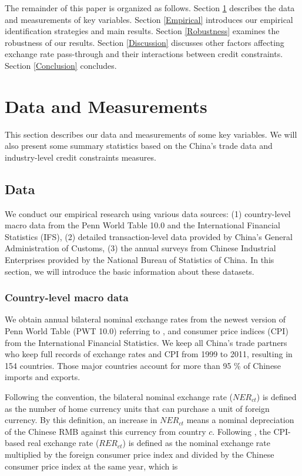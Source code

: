 \documentclass[12pt]{article}
\begin{document}
The remainder of this paper is organized as follows. Section \ref{Data&Measurements} describes the data and measurements of key variables. Section \ref{Empirical} introduces our empirical identification strategies and main results. Section \ref{Robustness} examines the robustness of our results.  Section \ref{Discussion} discusses other factors affecting exchange rate pass-through and their interactions between credit constraints. Section \ref{Conclusion} concludes.

\section{Data and Measurements} \label{Data&Measurements}

This section describes our data and measurements of some key variables. We will also present some summary statistics based on the China's trade data and industry-level credit constraints measures.

\subsection{Data} \label{Data}

We conduct our empirical research using various data sources: (1) country-level macro data from the Penn World Table 10.0 and the International Financial Statistics (IFS), (2) detailed transaction-level data provided by China’s General Administration of Customs, (3) the annual surveys from Chinese Industrial Enterprises provided by the National Bureau of Statistics of China.  In this section, we will introduce the basic information about these datasets.

\subsubsection{Country-level macro data} \label{Data-Macro}

We obtain annual bilateral nominal exchange rates from the newest version of Penn World Table (PWT 10.0) referring to \cite{feenstra2015}, and consumer price indices (CPI) from the International Financial Statistics. We keep all China's trade partners who keep full records of exchange rates and CPI from 1999 to 2011, resulting in 154 countries. Those major countries account for more than 95 \% of Chinese imports and exports.

Following the convention, the bilateral nominal exchange rate ($NER_{ct}$) is defined as the number of home currency units that can purchase a unit of foreign currency. By this definition, an increase in $NER_{ct}$ means a nominal depreciation of the Chinese RMB against this currency from country $c$. Following \cite{lmx2015}, the CPI-based real exchange rate ($RER_{ct}$) is defined as the nominal exchange rate multiplied by the foreign consumer price index and divided by the Chinese consumer price index at the same year, which is
\end{document}
